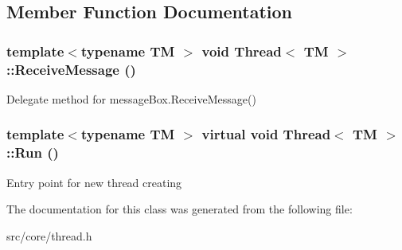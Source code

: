 \subsection{Member Function Documentation}
\hypertarget{classThread_3_01TM_01_4_a436671ed271ff2cc47e228b9f2d62043}{
\subsubsection[{ReceiveMessage}]{\setlength{\rightskip}{0pt plus 5cm}template$<$typename TM $>$ void Thread$<$ TM $>$::ReceiveMessage ()}}
\label{d6/d40/classThread_3_01TM_01_4_a436671ed271ff2cc47e228b9f2d62043}
Delegate method for messageBox.ReceiveMessage() \hypertarget{classThread_3_01TM_01_4_a07205f10bf394dcd1d31f3501236c77a}{
\subsubsection[{Run}]{\setlength{\rightskip}{0pt plus 5cm}template$<$typename TM $>$ virtual void Thread$<$ TM $>$::Run ()}}
\label{d6/d40/classThread_3_01TM_01_4_a07205f10bf394dcd1d31f3501236c77a}
Entry point for new thread creating 

The documentation for this class was generated from the following file:\begin{DoxyCompactItemize}
\item 
src/core/thread.h\end{DoxyCompactItemize}
